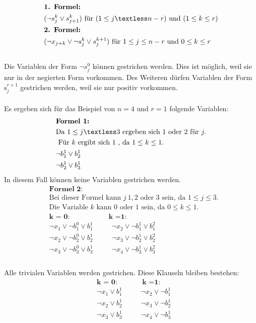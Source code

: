\documentclass[a4,abstract=on]{scrartcl}
\begin{document}
\begin{align*}
&\textbf{1. Formel:}\\
&(\neg s_j^k \vee s_{j+1}^k) \text{ für } (1 \leq j \textless n - r) \text{ und } (1 \leq k \leq r)\\
&\textbf{2. Formel:}\\
&(\neg x_{j+k} \vee \neg s_j^k \vee s_j^{k+1}) \text{ für } 1 \leq j \leq n - r \text{ und } 0 \leq k \leq r\\
\end{align*}
\ \\
Die Variablen der Form  $\neg s_j^0$ können gestrichen werden. Dies ist möglich, weil sie nur in der negierten Form vorkommen. Des Weiteren dürfen Variablen der Form $\text{s}_j^{r+1}$ gestrichen werden, weil sie nur positiv vorkommen.\\
\ \\
Es ergeben sich für das Beispiel von $n=4$ und $r=1$ folgende Variablen:\\
\begin{align*}
&\textbf{Formel 1:}\\
& \text{Da } 1 \leq j \textless 3 \text{ ergeben sich } 1 \text{ oder } 2 \text{ für } j.\\
&\text{ Für } k \text{ ergibt sich } 1 \text{ , da } 1 \leq k \leq 1.\\
&\neg b_1^1 \vee b_2^1\\
&\neg b_2^1 \vee b_3^1\\
\end{align*}
In diesem Fall können keine Variablen gestrichen werden.\\

\begin{align*}
&\textbf{Formel 2:}\\
& \text{Bei dieser Formel kann } j {~} 1, 2 \text{ oder } 3 \text{ sein, da }1 \leq j \leq 3. \\
&\text{Die Variable } k \text{ kann } 0 \text{ oder } 1 \text{ sein, da } 0 \leq k \leq 1.\\
&\textbf{k = 0:} {~~~~~~~~~~~~~~~~~~~~~~~~~} \textbf{k =1:}\\
&\neg x_1 \vee \neg b_1^0 \vee b_1^1 {~~~~~~~~~~~~}\neg x_2 \vee \neg b_1^1 \vee b_1^2\\
&\neg x_2 \vee \neg b_2^0 \vee b_2^1 {~~~~~~~~~~~~} \neg x_3 \vee \neg b_2^1 \vee b_2^2\\
&\neg x_3 \vee \neg b_3^0 \vee b_3^1 {~~~~~~~~~~~~} \neg x_4 \vee \neg b_3^1 \vee b_3^2\\
\end{align*}
\ \\
Alle trivialen Variablen werden gestrichen. Diese Klauseln bleiben bestehen:\\
\begin{align*}
&\textbf{k = 0:} {~~~~~~~~~~~~~~~~}\textbf{k =1:}\\
&\neg x_1 \vee b_1^1{~~~~~~~~~~~~}\neg x_2 \vee \neg b_1^1 \\
&\neg x_2 \vee b_2^1{~~~~~~~~~~~~}\neg x_3 \vee \neg b_2^1 \\
&\neg x_3 \vee b_3^1{~~~~~~~~~~~~}\neg x_4 \vee \neg b_3^1 \\
\end{align*}
\end{document}
